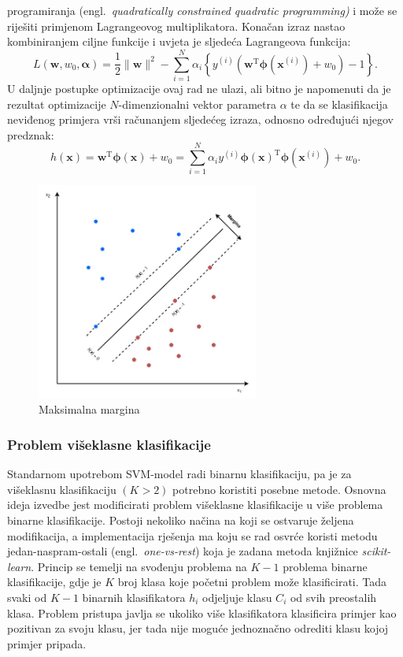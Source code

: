 \documentclass[times, utf8, zavrsni]{fer}
\begin{document}
programiranja (engl.~\emph{quadratically constrained quadratic programming)} i može se riješiti primjenom Lagrangeovog multiplikatora. Konačan izraz nastao kombiniranjem ciljne funkcije i uvjeta je sljedeća Lagrangeova funkcija: \[ L\left(\mathbf{w}, w_{0}, \boldsymbol{\alpha}\right)=\frac{1}{2}\|\mathbf{w}\|^{2}-\sum_{i=1}^{N} \alpha_{i}\left\{y^{(i)}\left(\mathbf{w}^{\mathrm{T}} \boldsymbol{\phi}\left(\mathbf{x}^{(i)}\right)+w_{0}\right)-1\right\} .\] U daljnje postupke optimizacije ovaj rad ne ulazi, ali bitno je napomenuti da je rezultat optimizacije $N$-dimenzionalni vektor parametra $\alpha$ te da se klasifikacija neviđenog primjera vrši računanjem sljedećeg izraza, odnosno određujući njegov predznak: \[ h(\mathbf{x})=\mathbf{w}^{\mathrm{T}} \boldsymbol{\phi}(\mathbf{x})+w_{0}=\sum_{i=1}^{N} \alpha_{i} y^{(i)} \boldsymbol{\phi}(\mathbf{x})^{\mathrm{T}} \boldsymbol{\phi}\left(\mathbf{x}^{(i)}\right)+w_{0}. \]

\begin{figure}
	\centering
	\includegraphics[width=0.65\textwidth]{svm2}
	\caption{Maksimalna margina }
	\label{svm_pic}
\end{figure}

\subsubsection{Problem višeklasne klasifikacije}

Standarnom upotrebom \gls{SVM}-model radi binarnu klasifikaciju, pa je za višeklasnu klasifikaciju $\left(K > 2\right)$ potrebno koristiti posebne metode. Osnovna ideja izvedbe jest modificirati problem višeklasne klasifikacije u više problema binarne klasifikacije. Postoji nekoliko načina na koji se ostvaruje željena modifikacija, a implementacija rješenja ma koju se rad osvrće koristi metodu jedan-naspram-ostali (engl.~\emph{one-vs-rest}) koja je zadana metoda knjižnice \emph{scikit-learn}. Princip se temelji na svođenju problema na $K - 1$ problema binarne klasifikacije, gdje je $K$ broj klasa koje početni problem može klasificirati. Tada svaki od $K-1$ binarnih klasifikatora $h_i$ odjeljuje klasu $C_i$ od svih preostalih klasa. Problem pristupa javlja se ukoliko više klasifikatora klasificira primjer kao pozitivan za svoju klasu, jer tada nije moguće jednoznačno odrediti klasu kojoj primjer pripada.
\end{document}
